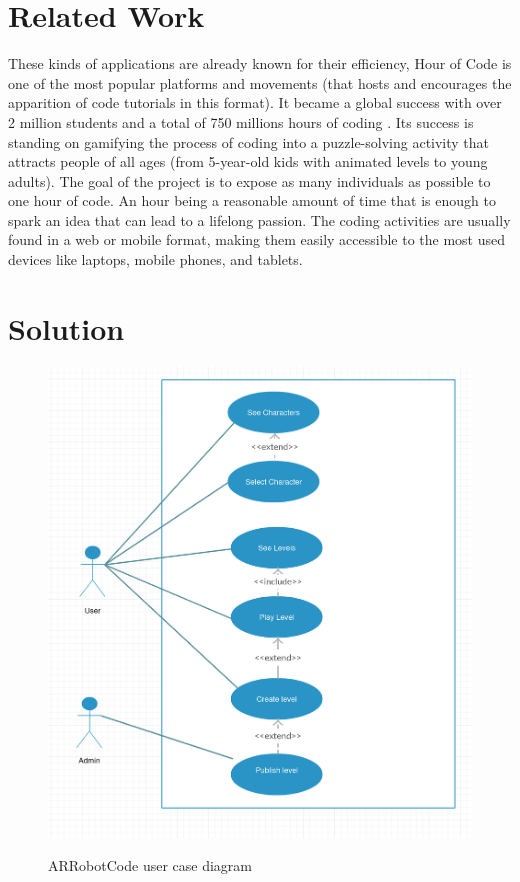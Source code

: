 \documentclass[12 pct]{report}
\begin{document}
\section{Related Work}\label{related-arrobot}
These kinds of applications are already known for their efficiency, Hour of Code \cite{wilson2014hour} is one of the most popular platforms and movements (that hosts and encourages the apparition of code tutorials in this format). 
It became a global success with over 2 million students and a total of 750 millions hours of coding \cite{codeorg}. 
Its success is standing on gamifying the process of coding into a puzzle-solving activity that attracts people of all ages (from 5-year-old kids with animated levels to young adults). 
The goal of the project is to expose as many individuals as possible to one hour of code. 
An hour being a reasonable amount of time that is enough to spark an idea that can lead to a lifelong passion. 
The coding activities are usually found in a web or mobile format, making them easily accessible to the most used devices like laptops, mobile phones, and tablets.

\section{Solution}

\begin{figure}[H]
\includegraphics[width=1\textwidth]{arrobotdiagram}
\centering
\label{fig:arrobotdiagram}
\caption{ARRobotCode user case diagram}
\end{figure}
\end{document}
